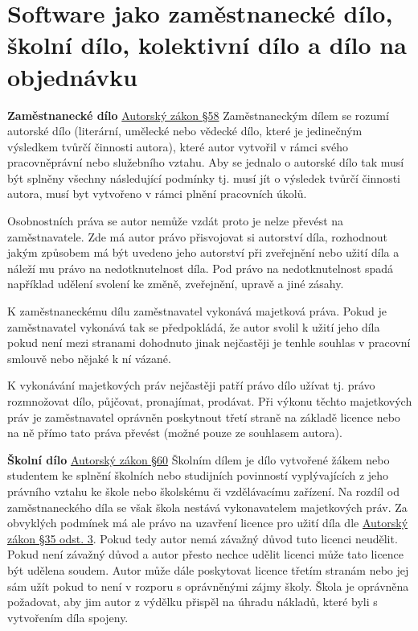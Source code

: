 \newpage
\section{Software jako zaměstnanecké dílo, školní dílo, kolektivní dílo a dílo na objednávku}

\textbf{Zaměstnanecké dílo} \href{https://www.zakonyprolidi.cz/cs/2000-121#p58}{Autorský zákon §58}
Zaměstnaneckým dílem se rozumí autorské dílo (literární, umělecké nebo vědecké dílo, které je jedinečným výsledkem tvůrčí činnosti autora), které autor vytvořil v rámci svého pracovněprávní nebo služebního vztahu. Aby se jednalo o autorské dílo tak musí být splněny všechny následující podmínky tj. musí jít o výsledek tvůrčí činnosti autora, musí byt vytvořeno v rámci plnění pracovních úkolů.

Osobnostních práva se autor nemůže vzdát proto je nelze převést na zaměstnavatele. Zde má autor právo přisvojovat si autorství díla, rozhodnout jakým způsobem má být uvedeno jeho autorství při zveřejnění nebo užití díla a náleží mu právo na nedotknutelnost díla. Pod právo na nedotknutelnost spadá například udělení svolení ke změně, zveřejnění, upravě a jiné zásahy.

K zaměstnaneckému dílu zaměstnavatel vykonává majetková práva. Pokud je zaměstnavatel vykonává tak se předpokládá, že autor svolil k užití jeho díla pokud není mezi stranami dohodnuto jinak nejčastěji je tenhle souhlas v pracovní smlouvě nebo nějaké k ní vázané. 

K vykonávání majetkových práv nejčastěji patří právo dílo užívat tj. právo rozmnožovat dílo, půjčovat, pronajímat, prodávat. Při výkonu těchto majetkových práv je zaměstnavatel oprávněn poskytnout třetí straně na základě licence nebo na ně přímo tato práva převést (možné pouze ze souhlasem autora).

\vspace{0.3cm}
\textbf{Školní dílo} \href{https://www.zakonyprolidi.cz/cs/2000-121#p60}{Autorský zákon §60}
Školním dílem je dílo vytvořené žákem nebo studentem ke splnění školních nebo studijních povinností vyplývajících z jeho právního vztahu ke škole nebo školskému či vzdělávacímu zařízení. Na rozdíl od zaměstnaneckého díla se však škola nestává vykonavatelem majetkových práv. Za obvyklých podmínek má ale právo na uzavření licence pro užití díla dle \href{https://www.zakonyprolidi.cz/cs/2000-121#p35-3}{Autorský zákon §35 odst. 3}. Pokud tedy autor nemá závažný důvod tuto licenci neudělit. Pokud není závažný důvod a autor přesto nechce udělit licenci může tato licence být udělena soudem. Autor může dále poskytovat licence třetím stranám nebo jej sám užít pokud to není v rozporu s oprávněnými zájmy školy. Škola je oprávněna požadovat, aby jim autor z výdělku přispěl na úhradu nákladů, které byli s vytvořením díla spojeny. 

